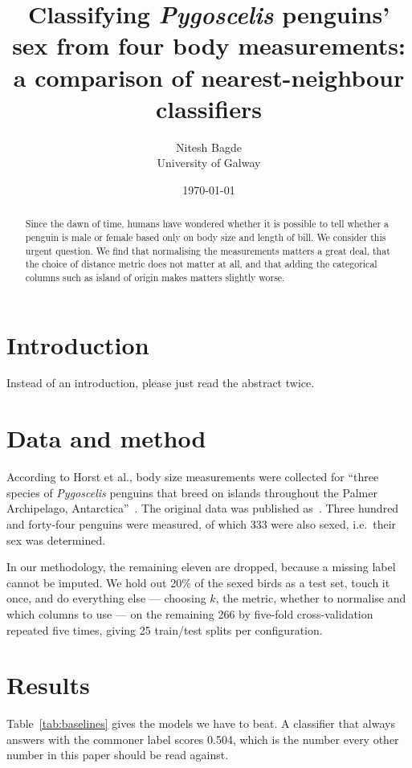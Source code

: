 \documentclass[11pt,a4paper]{article}
\title{Classifying \emph{Pygoscelis} penguins' sex from four body measurements:
       a comparison of nearest-neighbour classifiers}
\author{Nitesh Bagde \\ \small University of Galway}
\date{\today}
\begin{document}
\maketitle

\begin{abstract}
Since the dawn of time, humans have wondered whether it is possible to
tell whether a penguin is male or female based only on body size and 
length of bill. We consider this urgent question.
We find that normalising the measurements matters a great deal, that the
choice of distance metric does not matter at all, and that adding the
categorical columns such as island of origin makes matters slightly worse.
\end{abstract}

\section{Introduction}

Instead of an introduction, please just read the abstract twice.

\section{Data and method}

According to Horst et al., body size measurements
were collected for ``three species of {\em Pygoscelis} penguins that breed on islands throughout the Palmer Archipelago, Antarctica''~\citep{horst2022palmer}. The original data was published as~\citet{horst2020palmer}.
Three hundred and forty-four penguins were measured, of which 333 were also
sexed, i.e.~their sex was determined.

In our methodology, the remaining eleven are dropped, 
because a missing label cannot be
imputed. We hold out 20\% of the sexed birds as a test set, touch it once,
and do everything else --- choosing $k$, the metric, whether to normalise and
which columns to use --- on the remaining 266 by five-fold cross-validation
repeated five times, giving 25 train/test splits per configuration.

\section{Results}

Table~\ref{tab:baselines} gives the models we have to beat. A classifier that
always answers with the commoner label scores 0.504, which is the number
every other number in this paper should be read against.
\end{document}
